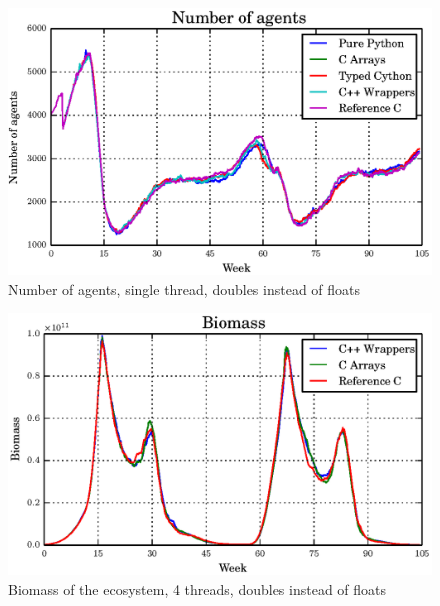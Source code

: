 \documentclass[12pt, a4paper]{report}
\begin{document}
\begin{appendices}
\begin{figure}[H]
  \begin{center}
    \includegraphics[width=\columnwidth]{graphs/ag-fixed-single-double-comp.eps}
    \caption{Number of agents, single thread, doubles instead of floats}
    \label{fig:ag-fixed-single-double-comp}
  \end{center}
\end{figure}

\begin{figure}[H]
  \begin{center}
    \includegraphics[width=\columnwidth]{graphs/bio-fixed-multi-double-comp.eps}
    \caption{Biomass of the ecosystem, 4 threads, doubles instead of floats}
    \label{fig:bio-fixed-multi-double-comp}
  \end{center}
\end{figure}


\end{appendices}
\end{document}
